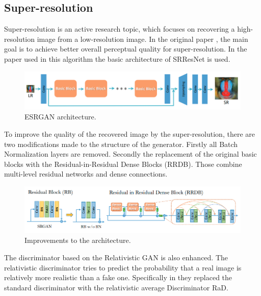 \subsection{Super-resolution}

Super-resolution is an active research topic, which focuses on recovering a high-resolution image from a low-resolution image. In the original paper \cite{wang2018esrgan}, the main goal is to achieve better overall perceptual quality for super-resolution. In the paper used in this algorithm the basic architecture of SRResNet is used. 

\begin{figure}[ht]
    \begin{center}
        \includegraphics*[scale=.4, pagebox=artbox]{resources/Background_SR_1.png}
        \caption{ESRGAN architecture. \cite{wang2018esrgan}} \label{ESRGAN_arch}
    \end{center}
\end{figure}

To improve the quality of the recovered image by the super-resolution, there are two modifications made to the structure of the generator. Firstly all Batch Normalization layers are removed. Secondly the replacement of the original basic blocks with the Residual-in-Residual Dense Blocks (RRDB). Those combine multi-level residual networks and dense connections.

\begin{figure}[ht]
    \begin{center}
        \includegraphics*[scale=.4, pagebox=artbox]{resources/Background_SR_2.png}
        \caption{Improvements to the architecture. \cite{wang2018esrgan}} \label{rESRGAN_nw}
    \end{center}
\end{figure}

The discriminator based on the Relativistic GAN is also enhanced. The relativistic discriminator tries to predict the probability that a real image is relatively more realistic than a fake one. Specifically in \cite{wang2018esrgan} they replaced the standard discriminator with the relativistic average Discriminator RaD.

